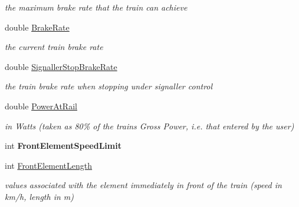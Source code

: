 \begin{DoxyCompactItemize}
\begin{DoxyCompactList}\small\item\em the maximum brake rate that the train can achieve \end{DoxyCompactList}\item 
\mbox{\label{class_t_train_afc10d4584267d8f4f05e9faa0a633a6e}} 
double \mbox{\hyperlink{class_t_train_afc10d4584267d8f4f05e9faa0a633a6e}{Brake\+Rate}}
\begin{DoxyCompactList}\small\item\em the current train brake rate \end{DoxyCompactList}\item 
\mbox{\label{class_t_train_a449a378257b8b3a3a2b3df40d0cca928}} 
double \mbox{\hyperlink{class_t_train_a449a378257b8b3a3a2b3df40d0cca928}{Signaller\+Stop\+Brake\+Rate}}
\begin{DoxyCompactList}\small\item\em the train brake rate when stopping under signaller control \end{DoxyCompactList}\item 
\mbox{\label{class_t_train_a6940d3fe404390d1d345a80bde3f6bf9}} 
double \mbox{\hyperlink{class_t_train_a6940d3fe404390d1d345a80bde3f6bf9}{Power\+At\+Rail}}
\begin{DoxyCompactList}\small\item\em in Watts (taken as 80\% of the train\textquotesingle{}s Gross Power, i.\+e. that entered by the user) \end{DoxyCompactList}\item 
\mbox{\label{class_t_train_aa9d994b88696a8680438b109dccfd679}} 
int {\bfseries Front\+Element\+Speed\+Limit}
\item 
\mbox{\label{class_t_train_aac3a242d9fee653d2dca155d0279cc83}} 
int \mbox{\hyperlink{class_t_train_aac3a242d9fee653d2dca155d0279cc83}{Front\+Element\+Length}}
\begin{DoxyCompactList}\small\item\em values associated with the element immediately in front of the train (speed in km/h, length in m) \end{DoxyCompactList}\item 
\mbox{\label{class_t_train_ab9dabc7092d31bc27b573e75ac74d0da}} 

\end{DoxyCompactItemize}
